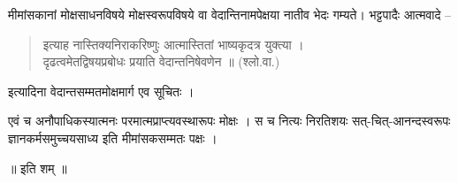 मीमांसकानां मोक्षसाधनविषये मोक्षस्वरूपविषये वा वेदान्तिनामपेक्षया नातीव भेदः गम्यते। भट्टपादैः आत्मवादे –
\begin{verse}
इत्याह नास्तिक्यनिराकरिष्णुः आत्मास्तितां भाष्यकृदत्र युक्त्या ।\\
दृढत्वमेतद्विषयप्रबोधः प्रयाति वेदान्तनिषेवणेन ॥ (श्लो.वा.)
\end{verse}
इत्यादिना वेदान्तसम्मतमोक्षमार्ग एव सूचितः ।

एवं च अनौपाधिकस्यात्मनः परमात्मप्राप्त्यवस्थारूपः मोक्षः । स च नित्यः निरतिशयः सत्-चित्-आनन्दस्वरूपः ज्ञानकर्मसमुच्चयसाध्य इति मीमांसकसम्मतः पक्षः ।

\centerline{॥ इति शम् ॥}

\articleend
